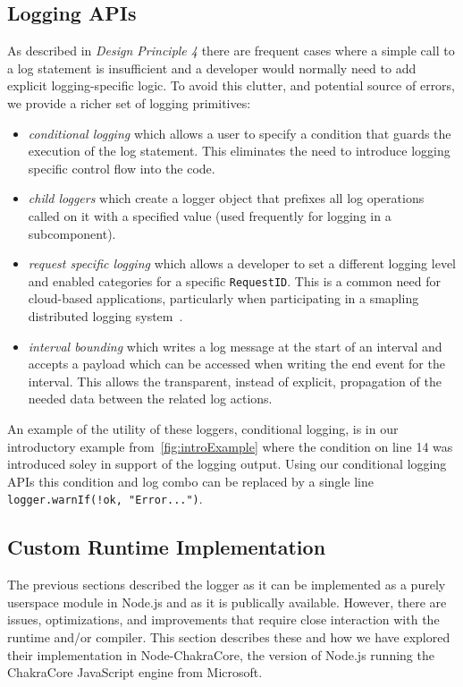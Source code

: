 \subsection{Logging APIs}
As described in \emph{Design Principle 4} there are frequent cases where a 
simple call to a log statement is insufficient and a developer would normally 
need to add explicit logging-specific logic. To avoid this clutter, and potential 
source of errors, we provide a richer set of logging primitives:
\begin{itemize}
  \item \emph{conditional logging} which allows a user to specify a condition 
  that guards the execution of the log statement. This eliminates the need to 
  introduce logging specific control flow into the code.
  \item \emph{child loggers} which create a logger object that prefixes all log 
  operations called on it with a specified value (used frequently for logging in a 
  subcomponent).
  \item \emph{request specific logging} which allows a developer to set a different 
  logging level and enabled categories for a specific \texttt{RequestID}. This is a 
  common need for cloud-based applications, particularly when participating in a 
  smapling distributed logging system~\cite{distlogger}.
  \item \emph{interval bounding} which writes a log message at the start of an interval 
  and accepts a payload which can be accessed when writing the end event for the interval. 
  This allows the transparent, instead of explicit, propagation of the needed data between 
  the related log actions.
\end{itemize}

An example of the utility of these loggers, conditional logging, is in our introductory 
example from~\autoref{fig:introExample} where the condition on line 14 was introduced 
soley in support of the logging output. Using our conditional logging APIs this condition 
and log combo can be replaced by a single line \lstinline{logger.warnIf(!ok, "Error...")}.

\subsection{Custom Runtime Implementation}
\label{sec:runtimesupport}
The previous sections described the \projn logger as it can be implemented as a purely 
userspace module in Node.js and as it is publically available. However, there are 
issues, optimizations, and improvements that require close interaction with the 
runtime and/or compiler. This section describes these and how we have explored their 
implementation in Node-ChakraCore, the version of Node.js running the ChakraCore 
JavaScript engine from Microsoft. 

